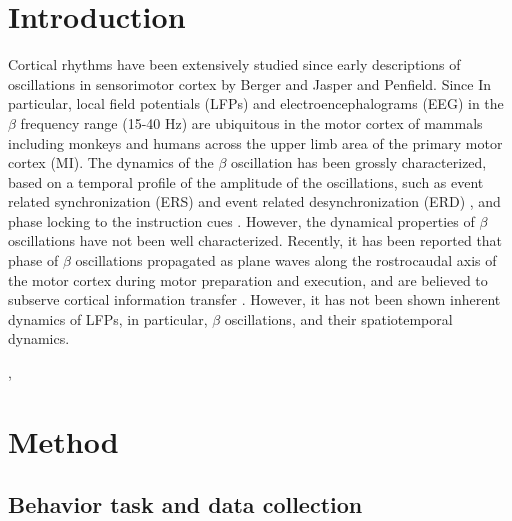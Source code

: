 \documentclass[a4paper]{jpconf}
\begin{document}
\begin{abstract}
\end{abstract}

\section{Introduction}
Cortical rhythms have been extensively studied since early descriptions of oscillations in sensorimotor cortex by Berger and Jasper and Penfield. Since In particular, local field potentials (LFPs)
and electroencephalograms (EEG) in the $\beta$ frequency range (15-40 Hz) are ubiquitous in the motor cortex of mammals including monkeys and humans across the upper limb area of the primary motor cortex (MI). The dynamics of the $\beta$ oscillation has been grossly characterized, based on a temporal profile of the amplitude of the oscillations, such as event related synchronization (ERS) and event related desynchronization (ERD) \cite{neuper2001}, and phase locking to the instruction cues \cite{Jake}. However, the dynamical properties of $\beta$ oscillations have not been well characterized. Recently, it has been reported that phase of $\beta$ oscillations propagated as plane waves along the rostrocaudal
axis of the motor cortex during motor preparation and execution, and are
believed to subserve cortical information transfer
\cite{ref:Rubino}. However, it has not been shown inherent dynamics of LFPs, in particular, $\beta$ oscillations, and their spatiotemporal dynamics. 






\cite{doug2006betawave}, \cite{taka2011humanbetawave}

\section{Method}
\label{sec:method}

\subsection{Behavior task and data collection}
\end{document}
